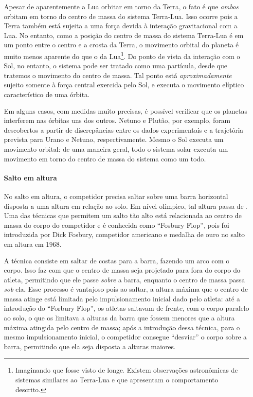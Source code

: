Apesar de aparentemente a Lua orbitar em torno da Terra, o fato é que \emph{ambos} orbitam em torno do centro de massa do sistema Terra-Lua. Isso ocorre pois a Terra também está sujeita a uma força devida à interação gravitacional com a Lua. No entanto, como a posição do centro de massa do sistema Terra-Lua é em um ponto entre o centro e a crosta da Terra, o movimento orbital do planeta é muito menos aparente do que o da Lua\footnote{Imaginando que fosse visto de longe. Existem observações astronômicas de sistemas similares ao Terra-Lua e que apresentam o comportamento descrito.}. Do ponto de vista da interação com o Sol, no entanto, o sistema pode ser tratado como uma partícula, desde que tratemos o movimento do centro de massa. Tal ponto está \emph{aproximadamente} sujeito somente à força central exercida pelo Sol, e executa o movimento elíptico característico de uma órbita.

Em alguns casos, com medidas muito precisas, é possível verificar que os planetas interferem nas órbitas uns dos outros. Netuno e Plutão, por exemplo, foram descobertos a partir de discrepâncias entre os dados experimentais e a trajetória prevista para Urano e Netuno, respectivamente. Mesmo o Sol executa um movimento orbital: de uma maneira geral, todo o sistema solar executa um movimento em torno do centro de massa do sistema como um todo. 

\paragraph{Salto em altura}

No salto em altura, o competidor precisa saltar sobre uma barra horizontal disposta a uma altura em relação ao solo. Em nível olímpico, tal altura passa de . Uma das técnicas que permitem um salto tão alto está relacionada ao centro de massa do corpo do competidor e é conhecida como ``Fosbury Flop'', pois foi introduzida por Dick Fosbury, competidor americano e medalha de ouro no salto em altura em 1968.

A técnica consiste em saltar de costas para a barra, fazendo um arco com o corpo. Isso faz com que o centro de massa seja projetado para fora do corpo do atleta, permitindo que ele passe \emph{sobre} a barra, enquanto o centro de massa passa \emph{sob} ela. Esse processo é vantajoso pois ao saltar, a altura máxima que o centro de massa atinge está limitada pelo impulsionamento inicial dado pelo atleta: até a introdução do ``Forbury Flop'', os atletas saltavam de frente, com o corpo paralelo ao solo, o que os limitava a alturas da barra que fossem menores que a altura máxima atingida pelo centro de massa; após a introdução dessa técnica, para o mesmo impulsionamento inicial, o competidor consegue ``desviar'' o corpo sobre a barra, permitindo que ela seja disposta a alturas maiores.

